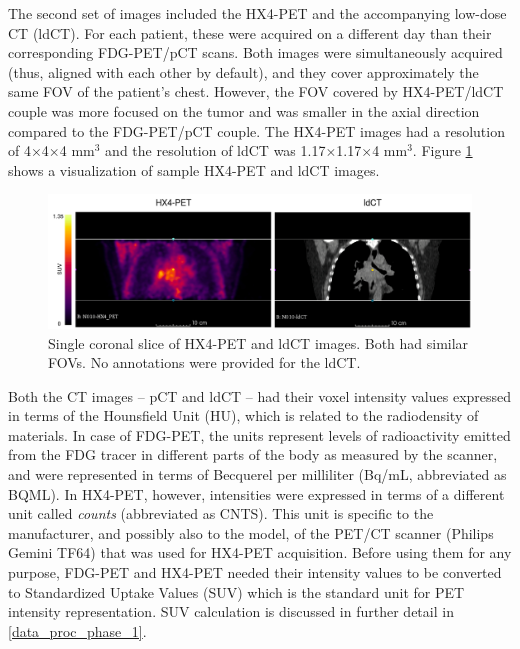 The second set of images included the HX4-PET and the accompanying low-dose CT (ldCT). For each patient, these were acquired on a different day than their corresponding FDG-PET/pCT scans. Both images were simultaneously acquired (thus, aligned with each other by default), and they cover approximately the same FOV of the patient's chest. However, the FOV covered by HX4-PET/ldCT couple was more focused on the tumor and was smaller in the axial direction compared to the FDG-PET/pCT couple. The HX4-PET images had a resolution of 4$\times$4$\times$4 mm$^3$ and the resolution of ldCT was 1.17$\times$1.17$\times$4 mm$^3$. Figure \ref{fig:original_hx4pet_ldct} shows a visualization of sample HX4-PET and ldCT images.

\begin{figure}[h!]
    \centering
    \includegraphics[width=\linewidth]{figures/Data/original/N010-HX4_PET_ldCT.png}
    \caption{Single coronal slice of HX4-PET and ldCT images. Both had similar FOVs. No annotations were provided for the ldCT.}
    \label{fig:original_hx4pet_ldct}
\end{figure}

Both the CT images -- pCT and ldCT -- had their voxel intensity values expressed in terms of the Hounsfield Unit (HU), which is related to the radiodensity of materials. In case of FDG-PET, the units represent levels of radioactivity emitted from the FDG tracer in different parts of the body as measured by the scanner, and were represented in terms of Becquerel per milliliter (Bq/mL, abbreviated as BQML). In HX4-PET, however, intensities were expressed in terms of a different unit called \textit{counts} (abbreviated as CNTS). This unit is specific to the manufacturer, and possibly also to the model, of the PET/CT scanner (Philips Gemini TF64) that was used for HX4-PET acquisition. Before using them for any purpose, FDG-PET and HX4-PET needed their intensity values to be converted to Standardized Uptake Values (SUV) which is the standard unit for PET intensity representation. SUV calculation is discussed in further detail in \ref{data_proc_phase_1}.



